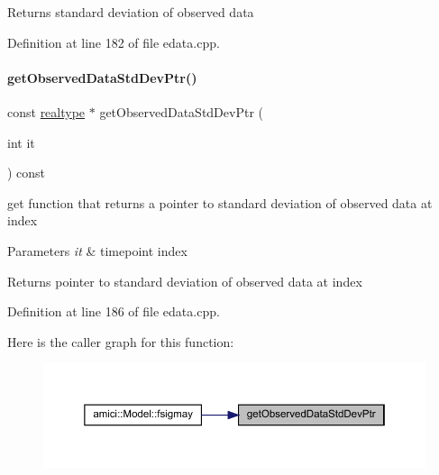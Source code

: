 \begin{DoxyReturn}{Returns}
standard deviation of observed data 
\end{DoxyReturn}


Definition at line 182 of file edata.\+cpp.

\mbox{\label{classamici_1_1_exp_data_ad0ca0d6d8d5b6bb5587570d70bd3a4fc}} 
\paragraph{\texorpdfstring{getObservedDataStdDevPtr()}{getObservedDataStdDevPtr()}}
{\footnotesize\ttfamily const \mbox{\hyperlink{namespaceamici_a1bdce28051d6a53868f7ccbf5f2c14a3}{realtype}} $\ast$ get\+Observed\+Data\+Std\+Dev\+Ptr (\begin{DoxyParamCaption}\item[{int}]{it }\end{DoxyParamCaption}) const}

get function that returns a pointer to standard deviation of observed data at index


\begin{DoxyParams}{Parameters}
{\em it} & timepoint index \\
\hline
\end{DoxyParams}
\begin{DoxyReturn}{Returns}
pointer to standard deviation of observed data at index 
\end{DoxyReturn}


Definition at line 186 of file edata.\+cpp.

Here is the caller graph for this function\+:
\nopagebreak
\begin{figure}[H]
\begin{center}
\leavevmode
\includegraphics[width=350pt]{classamici_1_1_exp_data_ad0ca0d6d8d5b6bb5587570d70bd3a4fc_icgraph}
\end{center}
\end{figure}
\mbox{\label{classamici_1_1_exp_data_ae621c2d67f85f390d01a97658c956098}} 
